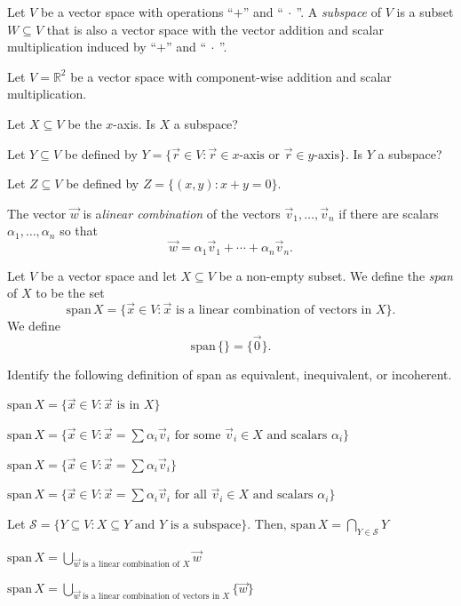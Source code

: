 \documentclass[14pt]{problemset}
\newcommand{\R}{\mathbb{R}}
\newcommand{\Span}{\mathrm{span}\,}
\begin{document}
	\begin{definition}[Subspace]
		Let $V$ be a vector space with operations ``$+$'' and ``$\ \cdot\ $''. A 
		\emph{subspace} of $V$ is a subset $W\subseteq V$ that is also a vector
		space with the vector addition and scalar multiplication induced
		by ``$+$'' and ``$\ \cdot\ $''.
	\end{definition}

	\question
		Let $V=\R^2$ be a vector space with component-wise addition and scalar
		multiplication.
	\begin{parts}
		\item Let $X\subseteq V$ be the $x$-axis. Is $X$ a subspace?
		\item Let $Y\subseteq V$ be defined by $Y=\{\vec r\in V:\vec r\in x\text{-axis or }
			\vec r\in y\text{-axis}\}$. Is $Y$ a subspace?
		\item Let $Z\subseteq V$ be defined by $Z=\{(x,y):x+y=0\}$.
	\end{parts}

	\newpage
	\begin{definition}
		The vector $\vec w$ is a\emph{linear combination} of the vectors $\vec v_1,\ldots,\vec v_n$
		if there are scalars $\alpha_1,\ldots,\alpha_n$ so that
		\[
			\vec w=\alpha_1\vec v_1+\cdots+\alpha_n\vec v_n.
		\]
	\end{definition}
	\begin{definition}[Span]
		Let $V$ be a vector space and let $X\subseteq V$ be a non-empty subset. We define the \emph{span}
		of $X$ to be the set
		\[
			\Span X = \{\vec x\in V:\text{$\vec x$ is a linear combination of vectors in $X$}\}.
		\]
		We define
		\[
			\Span \{\} = \{\vec 0\}.
		\]
	\end{definition}

	\question
		Identify the following definition of span as equivalent, inequivalent, or incoherent.
	\begin{parts}
		\item $\Span X = \{\vec x\in V : \vec x\text{ is in }X\}$
		\item $\Span X = \{\vec x\in V : \vec x=\sum\alpha_i\vec v_i\text{ for some }\vec v_i\in X\text{ and scalars }\alpha_i\}$
		\item $\Span X = \{\vec x\in V : \vec x=\sum\alpha_i\vec v_i\}$
		\item $\Span X = \{\vec x\in V : \vec x=\sum\alpha_i\vec v_i\text{ for all }\vec v_i\in X\text{ and scalars }\alpha_i\}$
		\item Let $\mathcal S = \{Y\subseteq V:X\subseteq Y\text{ and }Y\text{ is a subspace}\}$. 
			Then, $\displaystyle\Span X= \bigcap_{Y\in \mathcal S} Y$
		\item $\Span X = \displaystyle \bigcup_{\text{$\vec w$ is a linear combination of $X$}} \vec w$
		\item $\Span X = \displaystyle \bigcup_{\text{$\vec w$ is a linear combination of vectors in $X$}} \{\vec w\}$
	\end{parts}
\end{document}
